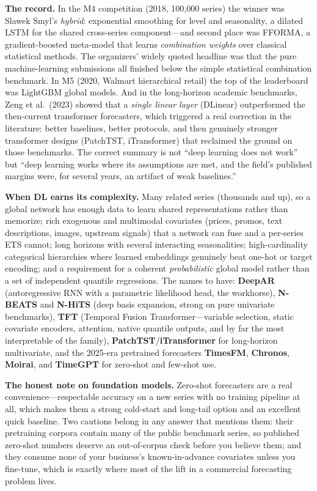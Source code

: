 \textbf{The record.} In the M4 competition (2018, 100{,}000 series) the winner was Slawek Smyl's \emph{hybrid}: exponential smoothing for level and seasonality, a dilated LSTM for the shared cross-series component---and second place was FFORMA, a gradient-boosted meta-model that learns \emph{combination weights} over classical statistical methods. The organizers' widely quoted headline was that the pure machine-learning submissions all finished below the simple statistical combination benchmark. In M5 (2020, Walmart hierarchical retail) the top of the leaderboard was LightGBM global models. And in the long-horizon academic benchmarks, Zeng et al.\ (2023) showed that a \emph{single linear layer} (DLinear) outperformed the then-current transformer forecasters, which triggered a real correction in the literature: better baselines, better protocols, and then genuinely stronger transformer designs (PatchTST, iTransformer) that reclaimed the ground on those benchmarks. The correct summary is not ``deep learning does not work'' but ``deep learning works where its assumptions are met, and the field's published margins were, for several years, an artifact of weak baselines.''

\textbf{When DL earns its complexity.} Many related series (thousands and up), so a global network has enough data to learn shared representations rather than memorize; rich exogenous and multimodal covariates (prices, promos, text descriptions, images, upstream signals) that a network can fuse and a per-series ETS cannot; long horizons with several interacting seasonalities; high-cardinality categorical hierarchies where learned embeddings genuinely beat one-hot or target encoding; and a requirement for a coherent \emph{probabilistic} global model rather than a set of independent quantile regressions. The names to have: \textbf{DeepAR} (autoregressive RNN with a parametric likelihood head, the workhorse), \textbf{N-BEATS} and \textbf{N-HiTS} (deep basis expansion, strong on pure univariate benchmarks), \textbf{TFT} (Temporal Fusion Transformer---variable selection, static covariate encoders, attention, native quantile outputs, and by far the most interpretable of the family), \textbf{PatchTST}/\textbf{iTransformer} for long-horizon multivariate, and the 2025-era pretrained forecasters \textbf{TimesFM}, \textbf{Chronos}, \textbf{Moirai}, and \textbf{TimeGPT} for zero-shot and few-shot use.

\textbf{The honest note on foundation models.} Zero-shot forecasters are a real convenience---respectable accuracy on a new series with no training pipeline at all, which makes them a strong cold-start and long-tail option and an excellent quick baseline. Two cautions belong in any answer that mentions them: their pretraining corpora contain many of the public benchmark series, so published zero-shot numbers deserve an out-of-corpus check before you believe them; and they consume none of your business's known-in-advance covariates unless you fine-tune, which is exactly where most of the lift in a commercial forecasting problem lives.

